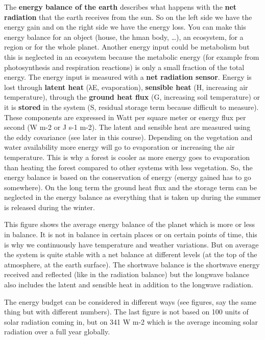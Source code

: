 \documentclass[oneside]{book}
\begin{document}
The \textbf{energy balance of the earth} describes what happens with the
\textbf{net radiation} that the earth receives from the sun. So on the
left side we have the energy gain and on the right side we have the
energy loss. You can make this energy balance for an object (house, the
hman body, \ldots{}), an ecosystem, for a region or for the whole
planet. Another energy input could be metabolism but this is neglected
in an ecosystem because the metabolic energy (for example from
photosynthesis and respiration reactions) is only a small fraction of
the total energy. The energy input is measured with a \textbf{net
radiation sensor}. Energy is lost through \textbf{latent heat} (λE,
evaporation), \textbf{sensible heat} (H, increasing air temperature),
through the \textbf{ground heat flux} (G, increasing soil temperature)
or it is \textbf{stored} in the system (S, residual storage term because
difficult to measure). These components are expressed in Watt per square
meter or energy flux per second (W m-2 or J s-1 m-2). The latent and
sensible heat are measured using the eddy covariance (see later in this
course). Depending on the vegetation and water availability more energy
will go to evaporation or increasing the air temperature. This is why a
forest is cooler as more energy goes to evaporation than heating the
forest compared to other systems with less vegetation. So, the energy
balance is based on the conservation of energy (energy gained has to go
somewhere). On the long term the ground heat flux and the storage term
can be neglected in the energy balance as everything that is taken up
during the summer is released during the winter.

This figure shows the average energy balance of the planet which is more
or less in balance. It is not in balance in certain places or on certain
points of time, this is why we continuously have temperature and weather
variations. But on average the system is quite stable with a net balance
at different levels (at the top of the atmosphere, at the earth
surface). The shortwave balance is the shortwave energy received and
reflected (like in the radiation balance) but the longwave balance also
includes the latent and sensible heat in addition to the longwave
radiation.

The energy budget can be considered in different ways (see figures, say
the same thing but with different numbers). The last figure is not based
on 100 units of solar radiation coming in, but on 341 W m-2 which is the
average incoming solar radiation over a full year globally.
\end{document}
